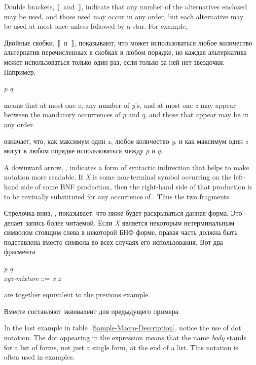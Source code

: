\begin{newer}
Double brackets, $\dlbrack$ and $\drbrack$, indicate that any number of the
alternatives enclosed may be used, and those used
may occur in any order, but each
alternative may be used at most once unless followed by a star.
For example,

Двойные скобки, $\dlbrack$ и $\drbrack$, показывают, что может использоваться
любое количество альтернатив перечисленных в скобках в любом порядке, но каждая
альтернатива может использоваться только один раз, если только за ней нет
звездочки.
Например,
\begin{tabbing}
{\it p}  {\it q}
\end{tabbing}
means that
at most one {\it x}, any number of {\it y}'s, and at most one {\it z}
may appear between the mandatory occurrences of {\it p}
and {\it q}, and those that appear may be in any order.

означает, что, как максимум один {\it x}, любое количество {\it y}, и как максимум
один {\it z} могут в любом порядке использоваться между {\it p} и {\it q}.

A downward arrow, \Mind{}, indicates a form of syntactic indirection
that helps to make \Mchoice{~} notation more readable.  If {\it X} is
some non-terminal symbol occurring on the left-hand side of some BNF
production, then the right-hand
side of that production is to be textually substituted for any occurrence
of .  Thus the two fragments

Стрелочка вниз, \Mind{}, показывает, что ниже будет раскрываться данная
форма. Это делает запись \Mchoice{~} более читаемой. Если {\it X} является
некоторым нетерминальным символом стоящим слева в некоторой БНФ форме, правая
часть должна быть подставлена вместо символа  во всех случаях его
использования. Вот два фрагмента
\begin{tabbing}
{\it p}  {\it q} \\
{\it xyz-mixture} ::= {\it x\/} {\Mor}  {\Mor} {\it z\/}
\end{tabbing}
are together equivalent to the previous example.

Вместе составляют эквивалент для предыдущего примера.
\end{newer}

In the last example in table~\ref{Sample-Macro-Description}, notice the
use of dot notation.  The dot appearing in the expression
 means that the name {\it body} stands
for a list of forms, not just a single form, at the end of a list.  This
notation is often used in examples.

